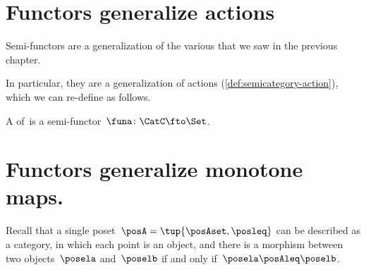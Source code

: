 
\section[\dots as \SY{semicategory} actions]{Functors generalize  actions}


Semi-functors are a generalization of the various  that we saw in the previous chapter.


In particular, they are a generalization of  actions (\cref{def:semicategory-action}), which we can re-define as follows.

\begin{ctdefinition}\label{def:semicat-action-redefined}
    A  of~\CatC is a semi-functor~$\funa\colon \CatC \fto \Set$.
\end{ctdefinition}

\section[\dots as  monotone maps]{Functors generalize monotone maps.}
\label{sec:posetsarecats}


Recall that a single poset~$\posA=\tup{\posAset, \posleq}$ can be described as a category, in which each point is an object, and there is a morphism between two objects~$\posela$ and~$\poselb$ if and only if~$\posela \posAleq \poselb$.

